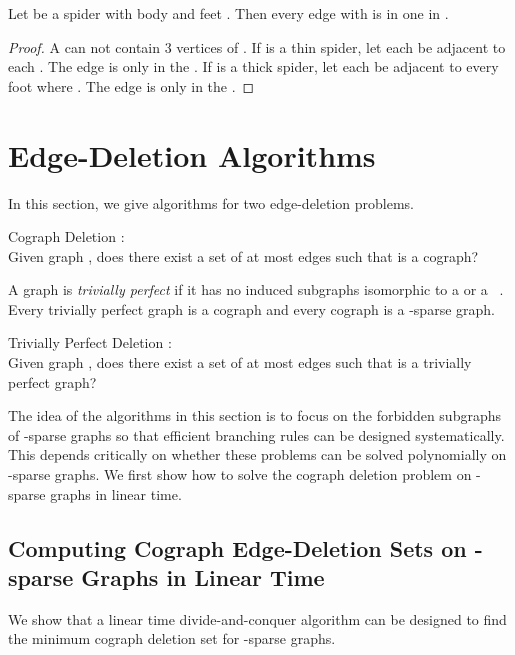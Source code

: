 \documentclass{llncs}
\begin{document}
\begin{lemma}\label{lem:unique}
  Let  be a spider with body  and feet . Then every edge  with  is in one  in . 
\end{lemma}

\begin{proof}
  A  can not contain 3 vertices of . If  is a thin spider, let each  be adjacent to each . The edge  is only in the . If  is a thick spider, let each  be adjacent to every foot  where . The edge  is only in the .
 \hfill 
\end{proof}

\section{Edge-Deletion Algorithms}

In this section, we give algorithms for two edge-deletion problems.

\begin{problem}{\sc Cograph Deletion} :\\
Given graph , does there exist a set  of at most  edges such that  is a cograph?
\end{problem}

A graph is \emph{trivially perfect} if it has no induced subgraphs isomorphic to a  or a ~\cite{YCC}. Every trivially perfect graph is a cograph and every cograph is a -sparse graph.

\begin{problem}{\sc Trivially Perfect Deletion} :\\
Given graph , does there exist a set  of at most  edges such that  is a trivially perfect graph?
\end{problem}

The idea of the algorithms in this section is to focus on the forbidden subgraphs of -sparse graphs so that efficient branching rules can be designed systematically. This depends critically on whether these problems can be solved polynomially on -sparse graphs. We first show how to solve the cograph deletion problem on -sparse graphs in linear time.

\subsection{Computing Cograph Edge-Deletion Sets on -sparse Graphs in Linear Time}

We show that a linear time divide-and-conquer algorithm can be designed to find the minimum cograph deletion set for -sparse graphs.
\end{document}
